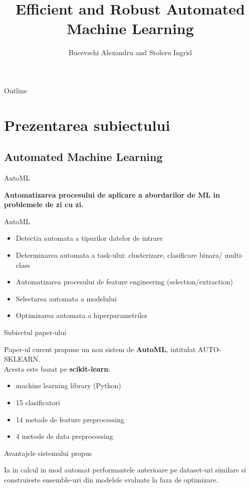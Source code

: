 \documentclass{beamer}
\title[Short Paper Title] %
{Efficient and Robust Automated Machine Learning}
\author[Author] %
{Bucevschi Alexandru\inst{1} and Stoleru Ingrid\inst{1}}
\institute[Universities of Somewhere and Elsewhere] %
{
  \inst{1}
  Facultatea de Informatica\\
  Universitatea "Alexandru Ioan Cuza"
}
\begin{document}
\begin{frame}
  \titlepage
\end{frame}

\begin{frame}{Outline}
  \tableofcontents
\end{frame}

\section{Prezentarea subiectului}

\subsection{Automated Machine Learning}

\begin{frame}{AutoML}
	\begin{center}
		\textbf{Automatizarea procesului de aplicare a abordarilor de ML in problemele de zi cu zi.}
	\end{center}
\end{frame}

\begin{frame}{AutoML}
	\begin{center}
		\begin{itemize}
			\item Detectia automata a tipurilor datelor de intrare
			\item Determinarea automata a task-ului: clusterizare, clasificare binara/ multi-class
			\item Automatizarea procesului de feature engineering (selection/extraction)
			\item Selectarea automata a modelului
			\item Optimizarea automata a hiperparametrilor
		\end{itemize}
	\end{center}
\end{frame}


\begin{frame}{Subiectul paper-ului}
	\begin{center}
		Paper-ul curent propune un nou sistem de \textbf{AutoML}, intitulat AUTO-SKLEARN.\\
		\vspace{0.5cm}
		Acesta este bazat pe \textbf{scikit-learn}:
		\vspace{0.25cm}
		\begin{itemize}
			\item machine learning library (Python)
			\item 15 clasificatori
			\item 14 metode de feature preprocessing
			\item 4 metode de data preprocessing
		\end{itemize}
	\end{center}
\end{frame}

\begin{frame}{Avantajele sistemului propus}
		\begin{center}
			Ia in calcul in mod automat performantele anterioare pe dataset-uri similare si construieste ensemble-uri din modelele evaluate la faza de optimizare.
		\end{center}
\end{frame}
\end{document}
